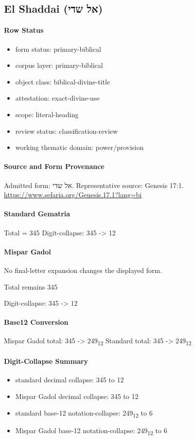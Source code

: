 \subsection{El Shaddai (אל שדי)}
\paragraph{Row Status}
\begin{itemize}
\item form status: primary-biblical
\item corpus layer: primary-biblical
\item object class: biblical-divine-title
\item attestation: exact-divine-use
\item scope: literal-heading
\item review status: classification-review
\item working thematic domain: power/provision
\end{itemize}
\paragraph{Source and Form Provenance}
Admitted form: אל שדי.
Representative source: Genesis 17:1.
\url{https://www.sefaria.org/Genesis.17.1?lang=bi}
\paragraph{Standard Gematria}
Total = 345
Digit-collapse: 345 -> 12
\paragraph{Mispar Gadol}
No final-letter expansion changes the displayed form.

Total remains 345

Digit-collapse: 345 -> 12
\paragraph{Base12 Conversion}
Mispar Gadol total: 345 -> 249\textsubscript{12}
Standard total: 345 -> 249\textsubscript{12}
\paragraph{Digit-Collapse Summary}
\begin{itemize}
\item standard decimal collapse: 345 to 12
\item Mispar Gadol decimal collapse: 345 to 12
\item standard base-12 notation-collapse: 249\textsubscript{12} to 6
\item Mispar Gadol base-12 notation-collapse: 249\textsubscript{12} to 6
\end{itemize}
